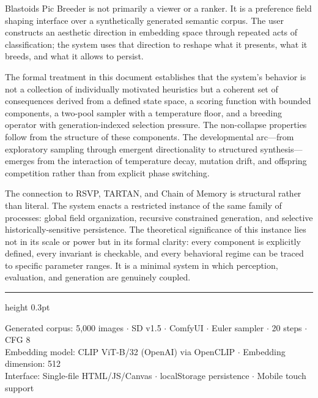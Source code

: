 \documentclass[12pt, a4paper]{article}
\theoremstyle{definition}
\begin{document}
Blastoids Pic Breeder is not primarily a viewer or a ranker. It is a preference field shaping interface over a synthetically generated semantic corpus. The user constructs an aesthetic direction in embedding space through repeated acts of classification; the system uses that direction to reshape what it presents, what it breeds, and what it allows to persist.

The formal treatment in this document establishes that the system's behavior is not a collection of individually motivated heuristics but a coherent set of consequences derived from a defined state space, a scoring function with bounded components, a two-pool sampler with a temperature floor, and a breeding operator with generation-indexed selection pressure. The non-collapse properties follow from the structure of these components. The developmental arc---from exploratory sampling through emergent directionality to structured synthesis---emerges from the interaction of temperature decay, mutation drift, and offspring competition rather than from explicit phase switching.

The connection to RSVP, TARTAN, and Chain of Memory is structural rather than literal. The system enacts a restricted instance of the same family of processes: global field organization, recursive constrained generation, and selective historically-sensitive persistence. The theoretical significance of this instance lies not in its scale or power but in its formal clarity: every component is explicitly defined, every invariant is checkable, and every behavioral regime can be traced to specific parameter ranges. It is a minimal system in which perception, evaluation, and generation are genuinely coupled.

\vspace{2em}
\hrule height 0.3pt
\vspace{1em}

\begin{center}
{\small\color{commentgray}
Generated corpus: 5,000 images $\cdot$ SD v1.5 $\cdot$ ComfyUI $\cdot$ Euler sampler $\cdot$ 20 steps $\cdot$ CFG 8\\
Embedding model: CLIP ViT-B/32 (OpenAI) via OpenCLIP $\cdot$ Embedding dimension: 512\\
Interface: Single-file HTML/JS/Canvas $\cdot$ localStorage persistence $\cdot$ Mobile touch support
}
\end{center}
\end{document}
